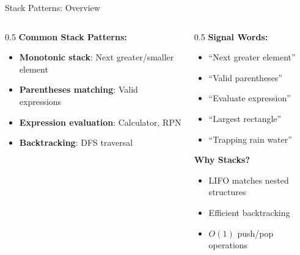 \documentclass[aspectratio=169,xcolor=dvipsnames]{beamer}
\begin{document}
\begin{frame}{Stack Patterns: Overview}
  \begin{columns}
    \begin{column}{0.5\textwidth}
      \textbf{Common Stack Patterns:}
      \begin{itemize}
        \item \textbf{Monotonic stack}: Next greater/smaller element
        \item \textbf{Parentheses matching}: Valid expressions
        \item \textbf{Expression evaluation}: Calculator, RPN
        \item \textbf{Backtracking}: DFS traversal
      \end{itemize}
    \end{column}

    \begin{column}{0.5\textwidth}
      \textbf{Signal Words:}
      \begin{itemize}
        \item ``Next greater element''
        \item ``Valid parentheses''
        \item ``Evaluate expression''
        \item ``Largest rectangle''
        \item ``Trapping rain water''
      \end{itemize}

      \vspace{0.3cm}
      \textbf{Why Stacks?}
      \begin{itemize}
        \item LIFO matches nested structures
        \item Efficient backtracking
        \item $O(1)$ push/pop operations
      \end{itemize}
    \end{column}
  \end{columns}
\end{frame}
\end{document}
